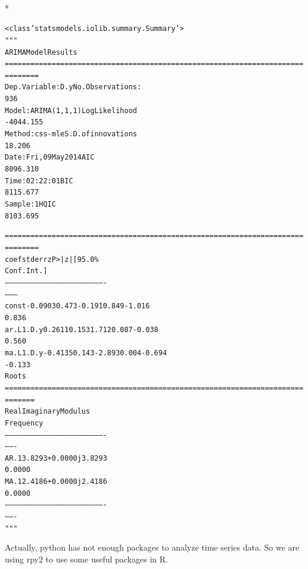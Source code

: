 \documentclass[letterpaper,10pt,english]{/Users/edwsurewin/anaconda/lib/python2.7/site-packages/sphinx/texinputs/sphinxhowto}
\def\smaller{\fontsize{9.5pt}{9.5pt}\selectfont}
\newenvironment{InvisibleVerbatim}
        {\begin{mdframed}[leftmargin=0.1\linewidth,innerleftmargin=3pt,innerrightmargin=3pt, userdefinedwidth=1\linewidth, linewidth=0pt, linecolor=white, usetwoside=false]}
        {\end{mdframed}}
\begin{document}
                \makebox[0.1\linewidth]{\smaller\hfill\tt\color{nbframe-out-prompt}Out\hspace{4pt}{[}7{]}:\hspace{4pt}}\\*
                \vspace{-2.55\baselineskip}\begin{InvisibleVerbatim}
                \vspace{-0.5\baselineskip}
\begin{alltt}<class 'statsmodels.iolib.summary.Summary'>
"""
                             ARIMA Model Results
======================================================================
========
Dep. Variable:                    D.y   No. Observations:
936
Model:                 ARIMA(1, 1, 1)   Log Likelihood
-4044.155
Method:                       css-mle   S.D. of innovations
18.206
Date:                Fri, 09 May 2014   AIC
8096.310
Time:                        02:22:01   BIC
8115.677
Sample:                             1   HQIC
8103.695

======================================================================
========
                 coef    std err          z      P>|z|      [95.0\%
Conf. Int.]
----------------------------------------------------------------------
--------
const         -0.0903      0.473     -0.191      0.849        -1.016
0.836
ar.L1.D.y      0.2611      0.153      1.712      0.087        -0.038
0.560
ma.L1.D.y     -0.4135      0.143     -2.893      0.004        -0.694
-0.133
                                    Roots
======================================================================
=======
                 Real           Imaginary           Modulus
Frequency
----------------------------------------------------------------------
-------
AR.1            3.8293           +0.0000j            3.8293
0.0000
MA.1            2.4186           +0.0000j            2.4186
0.0000
----------------------------------------------------------------------
-------
"""\end{alltt}

            \end{InvisibleVerbatim}
            
        
    
Actually, python has not enough packages to analyze time series data. So
we are using rpy2 to use some useful packages in R.

\end{document}
